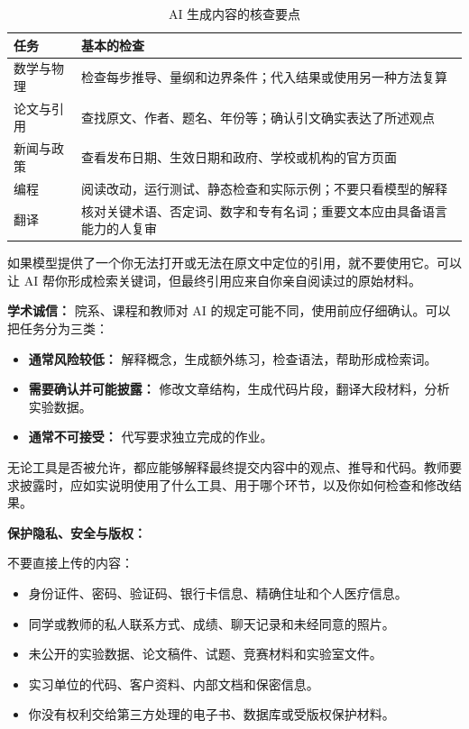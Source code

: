 \documentclass[11pt,oneside]{book}
\begin{document}
\begin{table}[htbp]
\centering
\begin{tabular}{lp{10cm}}
\hline
任务 & 基本的检查 \\
\hline
数学与物理 & 检查每步推导、量纲和边界条件；代入结果或使用另一种方法复算 \\
论文与引用 & 查找原文、作者、题名、年份等；确认引文确实表达了所述观点 \\
新闻与政策 & 查看发布日期、生效日期和政府、学校或机构的官方页面 \\
编程 & 阅读改动，运行测试、静态检查和实际示例；不要只看模型的解释 \\
翻译 & 核对关键术语、否定词、数字和专有名词；重要文本应由具备语言能力的人复审 \\
\hline
\end{tabular}
\caption{AI 生成内容的核查要点}
\end{table}

如果模型提供了一个你无法打开或无法在原文中定位的引用，就不要使用它。可以让 AI 帮你形成检索关键词，但最终引用应来自你亲自阅读过的原始材料。

\textbf{学术诚信：} 院系、课程和教师对 AI 的规定可能不同，使用前应仔细确认。可以把任务分为三类：

\begin{itemize}
    \item \textbf{通常风险较低：} 解释概念，生成额外练习，检查语法，帮助形成检索词。
    \item \textbf{需要确认并可能披露：} 修改文章结构，生成代码片段，翻译大段材料，分析实验数据。
    \item \textbf{通常不可接受：} 代写要求独立完成的作业。
\end{itemize}

无论工具是否被允许，都应能够解释最终提交内容中的观点、推导和代码。教师要求披露时，应如实说明使用了什么工具、用于哪个环节，以及你如何检查和修改结果。

\textbf{保护隐私、安全与版权：}

不要直接上传的内容：

\begin{itemize}
    \item 身份证件、密码、验证码、银行卡信息、精确住址和个人医疗信息。
    \item 同学或教师的私人联系方式、成绩、聊天记录和未经同意的照片。
    \item 未公开的实验数据、论文稿件、试题、竞赛材料和实验室文件。
    \item 实习单位的代码、客户资料、内部文档和保密信息。
    \item 你没有权利交给第三方处理的电子书、数据库或受版权保护材料。
\end{itemize}
\end{document}
